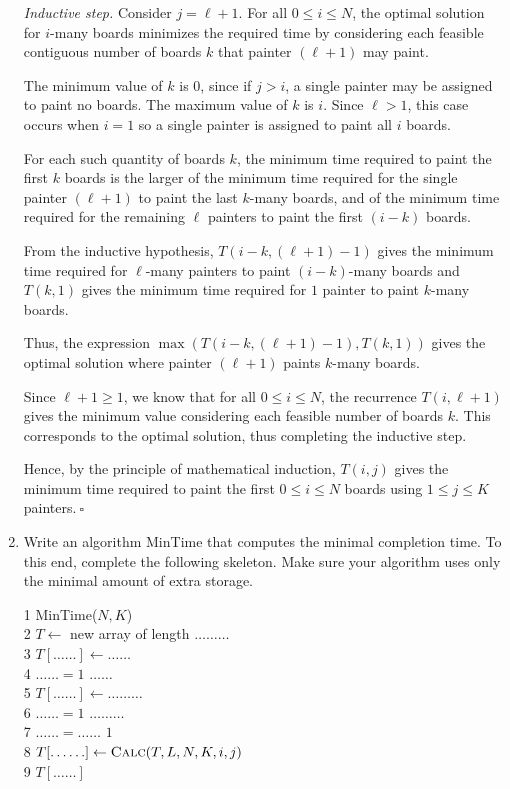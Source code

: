 \begin{enumerate}
\begin{solution}
\textit{Inductive step. }Consider $j=\ell+1$. For all $0\leq i\leq N$, the optimal solution for $i$-many boards minimizes the required time by considering each feasible contiguous number of boards $k$ that painter $(\ell+1)$ may paint.

The minimum value of $k$ is $0$, since if $j>i$, a single painter may be assigned to paint no boards. The maximum value of $k$ is $i$. Since $\ell>1$, this case occurs when $i=1$ so a single painter is assigned to paint all $i$ boards.

For each such quantity of boards $k$, the minimum time required to paint the first $k$ boards is the larger of the minimum time required for the single painter $(\ell+1)$ to paint the last $k$-many boards, and of the minimum time required for the remaining $\ell$ painters to paint the first $(i-k)$ boards.

From the inductive hypothesis, $T(i-k,(\ell+1)-1)$ gives the minimum time required for $\ell$-many painters to paint $(i-k)$-many boards and $T(k,1)$ gives the minimum time required for $1$ painter to paint $k$-many boards.

Thus, the expression $\max(T(i-k,(\ell+1)-1),T(k,1))$ gives the optimal solution where painter $(\ell+1)$ paints $k$-many boards.

Since $\ell+1\geq 1$, we know that for all $0\leq i\leq N$, the recurrence $T(i,\ell+1)$ gives the minimum value considering each feasible number of boards $k$. This corresponds to the optimal solution, thus completing the inductive step.

Hence, by the principle of mathematical induction, $T(i,j)$ gives the minimum time required to paint the first $0\leq i\leq N$ boards using $1\leq j\leq K$ painters.$~\square$
\end{solution}	
    \item Write an algorithm {\sc MinTime} that computes the minimal completion time. To this end, complete the following skeleton. Make sure your algorithm uses only the minimal amount of extra storage.
	
    \begin{code}
        1 {\sc MinTime}($N,K$)\\
        2 \> $T \gets $ new array of length $\ldots\ldots\ldots$ \\
        3 \> $T[\ldots\ldots] \gets \ldots\ldots$ \\
        4 \> \For $\ldots\ldots=1$ \To $\ldots\ldots$ \Do \\
        5 \> \> $T[\ldots\ldots] \gets \ldots\ldots\ldots$ \\
        6 \> \For $\ldots\ldots=1$ \To $\ldots\ldots\ldots$ \Do \\
        7 \> \> \For $\ldots\ldots=\ldots\ldots$ \DownTo $1$ \Do \\
        8 \> \> \>  $T[\ldots\ldots] \gets \text{\sc Calc}(T,L,N,K,i,j)$ \\
        9 \> \Return $T[\ldots\ldots]$
    \end{code}


\end{enumerate}
